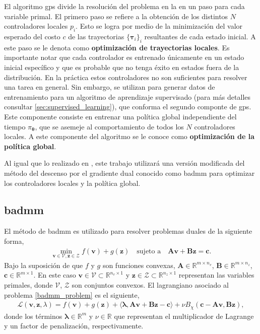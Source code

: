 El algoritmo \acrshort{gps} divide la resolución del problema en la  en un paso para cada variable primal. El primero paso se refiere a la obtención de los distintos $N$ controladores locales $p_i$. Esto se logra por medio de la minimización del valor esperado del costo $c$ de las trayectorias $\{\bm\tau_i\}_{i}$ resultantes de cada estado inicial. A este paso se le denota como \textbf{optimización de trayectorias locales}. Es importante notar que cada controlador es entrenado únicamente en un estado inicial específico y que es probable que no tenga éxito en estados fuera de la distribución. En la práctica estos controladores no son suficientes para resolver una tarea en general. Sin embargo, se utilizan para generar datos de entrenamiento para un algoritmo de aprendizaje supervisado (para más detalles consultar \ref{sec:supervised_learning}), que conforma el segundo componte de \acrshort{gps}. Este componente consiste en entrenar una política global independiente del tiempo $\pi_{\mathbf{\bm\theta}}$, que se asemeje al comportamiento de todos los $N$ controladores locales. A este componente del algoritmo se le conoce como  \textbf{optimización de la política global}.  \cite{Schneider2018}

Al igual que lo realizado en \cite{Deep_Visuomotor_Policies}\cite{Schneider2018}, este trabajo utilizará una versión modificada del método del descenso por el gradiente dual conocido como  \acrfull{badmm} \cite{wang2014bregman} para optimizar los controladores locales y la política global.

\subsection{\acrshort{badmm}}
El método de \acrshort{badmm} es utilizado para resolver problemas duales de la siguiente forma,
\begin{align}
    \min_{\mathbf{v} \in \mathcal{V}, \mathbf{z} \in \mathcal{Z}} f(\mathbf{v})+ g(\mathbf{z}) \quad \text{sujeto a} \quad \mathbf{A} \mathbf{v} + \mathbf{B} \mathbf{z} = \mathbf{c}.
    \label{badmm_problem}
\end{align}
Bajo la suposición de que $f$ y $g$ son funciones convexas, $\mathbf{A}\in \mathbb{R}^{m \times n_{v}}$, $\mathbf{B} \in \mathbb{R}^{m \times n_{z}}$, $\mathbf{c}\in \mathbb{R}^{m \times 1}$. En este caso $\mathbf{v}\in \mathcal{V}\subset\mathbb{R}^{n_v \times 1}$ y $\mathbf{z} \in \mathcal{Z}\subset\mathbb{R}^{n_z \times 1}$ representan las variables primales, donde $\mathcal{V}$, $\mathcal{Z}$ son conjuntos convexos. El lagrangiano asociado al problema \ref{badmm_problem} es el siguiente,
\begin{align}
    \mathcal{L}(\mathbf{v}, \mathbf{z}, \lambda) = 
    f(\mathbf{v}) + g(\mathbf{z}) + \langle\bm\lambda, \mathbf{A v} + \mathbf{B z} -\mathbf{c}\rangle + \nu B_{\chi}(\mathbf{c} - \mathbf{Av}, \mathbf{B z}), 
    \label{BADMM_lagrangian}
\end{align}
donde los términos $\bm\lambda \in \mathbb{R}^{m}$ y $\nu \in \mathbb{R}$ que representan el multiplicador de Lagrange y un factor de penalización, respectivamente. \cite{wang2014bregman}

